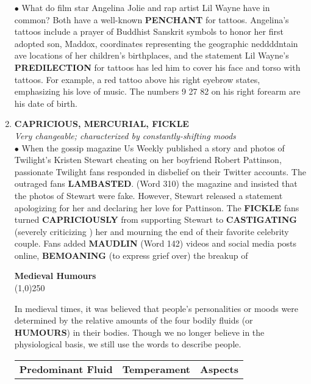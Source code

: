 \documentclass{book}
\begin{document}
\begin{enumerate}
$\bullet$ What do film star Angelina Jolie and rap artist Lil Wayne have in common? Both have a well-known \textbf{PENCHANT} for tattoos. Angelina's tattoos include a prayer of Buddhist Sanskrit symbols to honor her first adopted son, Maddox, coordinates representing the geographic neddddntain ave locations of her children's birthplaces, and the statement  Lil Wayne's \textbf{PREDILECTION} for tattoos has led him to cover his face and torso with tattoos. For example, a red tattoo above his right eyebrow states,  emphasizing his love of music. The numbers 9 27 82 on his right forearm are his date of birth.
 \item \textbf{CAPRICIOUS, MERCURIAL, FICKLE}\\
 \textit{ Very changeable; characterized by constantly-shifting moods}\\
 
 $\bullet$ When the gossip magazine Us Weekly  published a story and photos of Twilight's Kristen Stewart cheating on her boyfriend Robert Pattinson, passionate Twilight fans responded in disbelief on their Twitter accounts. The outraged fans \textbf{LAMBASTED}. (Word 310) the magazine and insisted that the photos of Stewart were fake. However, Stewart released a statement apologizing for her  and declaring her love for Pattinson. The \textbf{FICKLE} fans turned \textbf{CAPRICIOUSLY} from supporting Stewart to \textbf{CASTIGATING} (severely criticizing ) her and mourning the end of their favorite celebrity couple. Fans added \textbf{MAUDLIN} (Word 142) videos and social media posts online, \textbf{BEMOANING} (to express grief over) the breakup of   
\begin{tcolorbox}
\begin{center}
\textbf{ Medieval Humours}\\
\line(1,0){250}\\
\end{center}  
  In medieval times, it was believed that people's personalities or moods were determined by the relative amounts of the four bodily fluids (or \textbf{HUMOURS}) in their bodies. Though we no longer believe in the physiological basis, we still use the words to describe people. 
 \begin{center}
\centering%
\begin{tabular}{p{}
                p{}
                p{}
              }
\hline
\textbf{Predominant Fluid} & \textbf{Temperament} &  \textbf{Aspects } \\


\end{tabular}
\end{center}
\end{tcolorbox}
\end{enumerate}
\end{document}

